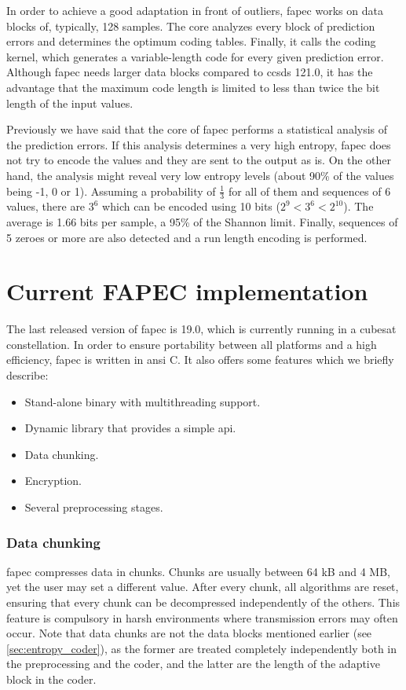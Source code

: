 In order to achieve a good adaptation in front of outliers, \acrshort{fapec} works on data blocks of, typically, 128 samples. The core analyzes every block of prediction errors and determines the optimum coding tables. Finally, it calls the coding kernel, which generates a variable-length code for every given prediction error. Although \acrshort{fapec} needs larger data blocks compared to \acrshort{ccsds} 121.0, it has the advantage that the maximum code length is limited to less than twice the bit length of the input values.

Previously we have said that the core of \acrshort{fapec} performs a statistical analysis of the prediction errors. If this analysis determines a very high entropy, \acrshort{fapec} does not try to encode the values and they are sent to the output as is. On the other hand, the analysis might reveal very low entropy levels (about 90\% of the values being -1, 0 or 1). Assuming a probability of $\frac{1}{3}$ for all of them and sequences of 6 values, there are $3^6$ which can be encoded using 10 bits ($2^9 < 3^6 < 2^{10}$). The average is 1.66 bits per sample, a 95\% of the Shannon limit. Finally, sequences of 5 zeroes or more are also detected and a run length encoding is performed.

\section{Current FAPEC implementation}
The last released version of \acrshort{fapec} is 19.0, which is currently running in a cubesat constellation. In order to ensure portability between all platforms and a high efficiency, \acrshort{fapec} is written in \acrshort{ansi} C. It also offers some features which we briefly describe:

\begin{itemize}
	\item Stand-alone binary with multithreading support.
	\item Dynamic library that provides a simple \acrshort{api}.
	\item Data chunking.
	\item Encryption.
	\item Several preprocessing stages.
\end{itemize}

\subsubsection{Data chunking}
\acrshort{fapec} compresses data in chunks. Chunks are usually between 64 kB and 4 MB, yet the user may set a different value. After every chunk, all algorithms are reset, ensuring that every chunk can be decompressed independently of the others. This feature is compulsory in harsh environments where transmission errors may often occur. Note that data chunks are not the data blocks mentioned earlier (see \ref{sec:entropy_coder}), as the former are treated completely independently both in the preprocessing and the coder, and the latter are the length of the adaptive block in the coder.

